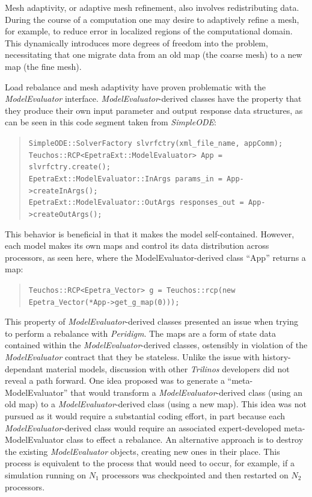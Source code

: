 \documentclass[10pt]{article}
\theoremstyle{plain}
\theoremstyle{definition}
\theoremstyle{remark}
\numberwithin{equation}{section}
\begin{document}
Mesh adaptivity, or adaptive mesh refinement, also involves redistributing data. During the course of a computation one may desire to adaptively refine a mesh, for example, to reduce error in localized regions of the computational domain. This dynamically introduces more degrees of freedom into the problem, necessitating that one migrate data from an old map (the coarse mesh) to a new map (the fine mesh).

Load rebalance and mesh adaptivity have proven problematic with the \emph{ModelEvaluator} interface. \emph{ModelEvaluator}-derived classes have the property that they produce their own input parameter and output response data structures, as can be seen in this code segment taken from \emph{SimpleODE}:
\begin{quote}
\vspace{-5pt}
\verb"SimpleODE::SolverFactory slvrfctry(xml_file_name, appComm);"\\
\verb"Teuchos::RCP<EpetraExt::ModelEvaluator> App = slvrfctry.create();"\\
\verb"EpetraExt::ModelEvaluator::InArgs params_in = App->createInArgs();"\\
\verb"EpetraExt::ModelEvaluator::OutArgs responses_out = App->createOutArgs();"\\
\vspace{-17pt}
\end{quote}
This behavior is beneficial in that it makes the model self-contained. However, each model makes its own maps and control its data distribution across processors, as seen here, where the ModelEvaluator-derived class ``App'' returns a map:
\begin{quote}
\vspace{-5pt}
\hspace{0pt}
\verb"Teuchos::RCP<Epetra_Vector> g = Teuchos::rcp(new Epetra_Vector(*App->get_g_map(0)));"\\
\vspace{-17pt}
\end{quote}
This property of \emph{ModelEvaluator}-derived classes presented an issue when trying to perform a rebalance with \emph{Peridigm}. The maps are a form of state data contained within the \emph{ModelEvaluator}-derived classes, ostensibly in violation of the \emph{ModelEvaluator} contract that they be stateless. Unlike the issue with history-dependant material models, discussion with other \emph{Trilinos} developers did not reveal a path forward. One idea proposed was to generate a ``meta-ModelEvaluator'' that would transform a \emph{ModelEvaluator}-derived class (using an old map) to a \emph{ModelEvaluator}-derived class (using a new map). This idea was not pursued as it would require a substantial coding effort, in part because each \emph{ModelEvaluator}-derived class would require an associated expert-developed meta-ModelEvaluator class to effect a rebalance. An alternative approach is to destroy the existing \emph{ModelEvaluator} objects, creating new ones in their place. This process is equivalent to the process that would need to occur, for example, if a simulation running on $N_1$ processors was checkpointed and then restarted on $N_2$ processors.
\end{document}
